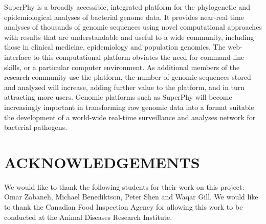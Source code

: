 \documentclass[a4paper,twoside]{article}
\begin{document}
\noindent SuperPhy is a broadly accessible, integrated platform for the phylogenetic and epidemiological analyses of bacterial genome data. It provides near-real time analyses of thousands of genomic sequences using novel computational approaches with results that are understandable and useful to a wide community, including those in clinical medicine, epidemiology and population genomics. The web-interface to this computational platform obviates the need for command-line skills, or a particular computer environment. As additional members of the research community use the platform, the number of genomic sequences stored and analyzed will increase, adding further value to the platform, and in turn attracting more users. Genomic platforms such as SuperPhy will become increasingly important in transforming raw genomic data into a format suitable the development of a world-wide real-time surveillance and analyses network for bacterial pathogens.

\section*{\uppercase{Acknowledgements}}

\noindent We would like to thank the following students for their work on this project: Omar Zabaneh, Michael Benediktson, Peter Shen and Waqar Gill. We would like to thank the Canadian Food Inspection Agency for allowing this work to be conducted at the Animal Diseases Research Institute.


\vfill

{\small
}

\vfill
\end{document}
